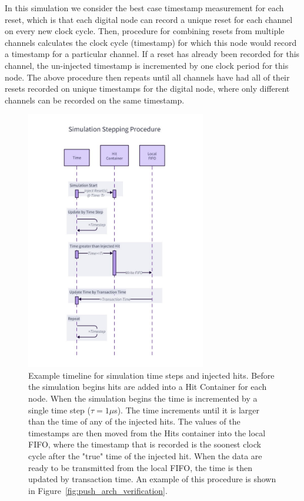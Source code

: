 In this simulation we consider the best case timestamp measurement for each reset, which is that each digital node can record a unique reset for each channel on every new clock cycle. 
Then, procedure for combining resets from multiple channels calculates the clock cycle (timestamp) for which this node would record a timestamp for a particular channel.
If a reset has already been recorded for this channel, the un-injected timestamp is incremented by one clock period for this node.
The above procedure then repeats until all channels have had all of their resets recorded on unique timestamps for the digital node, where only different channels can be recorded on the same timestamp.

\begin{figure}[]
\centering
\includegraphics[width=0.7\textwidth]{images/simulation_step_procedure.pdf}
\caption{Example timeline for simulation time steps and injected hits.
Before the simulation begins hits are added into a Hit Container for each node.
When the simulation begins the time is incremented by a single time step ($\tau = 1 \mu$\unit{s}).
The time increments until it is larger than the time of any of the injected hits.
The values of the timestamps are then moved from the Hits container into the local FIFO, where the timestamp that is recorded is the soonest clock cycle after the "true" time of the injected hit.
When the data are ready to be transmitted from the local FIFO, the time is then updated by transaction time.
An example of this procedure is shown in Figure~\ref{fig:push_arch_verification}. 
}
\end{figure}~\label{fig:simulation_step_procedure}

